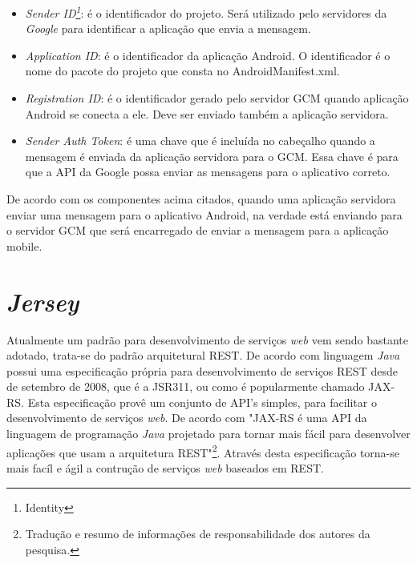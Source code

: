 \begin{itemize}
	
	\item \textit{Sender ID\footnote{Identity}}: é o identificador do projeto.
	Será utilizado pelo servidores da \textit{Google} para identificar a aplicação
	que envia a mensagem.
	
	\item \textit{Application ID}: é o identificador da aplicação Android. O
	identificador é o nome do pacote do projeto que consta no AndroidManifest.xml.
	
	\item \textit{Registration ID}: é o identificador gerado pelo servidor GCM
	quando aplicação Android se conecta a ele. Deve ser enviado também a aplicação
	servidora.
	
	\item \textit{Sender Auth Token}: é uma chave que é incluída no cabeçalho
	quando a mensagem é enviada da aplicação servidora para o GCM. Essa chave é
	para que a API da Google possa enviar as mensagens para o aplicativo correto.

\end{itemize}

	\par De acordo com os componentes acima citados, quando uma aplicação servidora
enviar uma mensagem para o aplicativo Android, na verdade está enviando para o
servidor GCM que será encarregado de enviar a mensagem para a aplicação mobile.

\section{\textit{Jersey}}

	\par Atualmente um padrão para desenvolvimento de serviços \textit{web} vem
sendo bastante adotado, trata-se do padrão arquitetural REST. De acordo com
 linguagem \textit{Java} possui uma especificação
própria para desenvolvimento de serviços REST desde de setembro de 2008, que é
a JSR311, ou como é popularmente chamado JAX-RS. Esta especificação provê um
conjunto de API's simples, para facilitar o desenvolvimento de serviços
\textit{web}. De acordo com  "JAX-RS é uma API da
linguagem de programação \textit{Java} projetado para tornar mais fácil para
desenvolver aplicações que usam a arquitetura REST"\footnote{Tradução e resumo
de informações de responsabilidade dos autores da pesquisa.}. Através desta
especificação torna-se mais facíl e ágil a contrução de serviços \textit{web}
baseados em REST.

